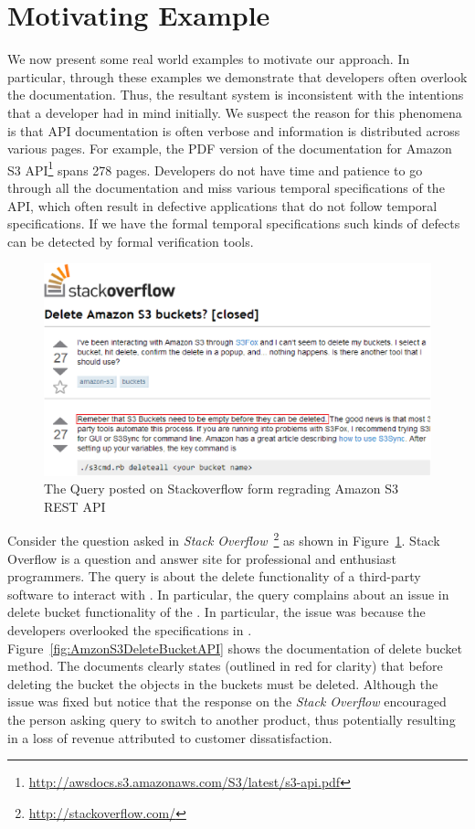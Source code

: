 \section{Motivating Example}
\label{sec:example}

We now present some real world examples to motivate our approach. In particular, through these examples we demonstrate that developers often overlook the documentation. Thus, the resultant system is inconsistent with the intentions that a developer had in mind initially. We suspect the reason for this phenomena is that API documentation is often verbose and information is distributed across various
pages. For example, the PDF version of the documentation for Amazon S3 API\footnote{\url{http://awsdocs.s3.amazonaws.com/S3/latest/s3-api.pdf}} spans 278 pages. Developers do not have time and patience to go through all the documentation and miss various temporal specifications of the API, which often result in defective applications that do not follow temporal specifications. 
If we have the formal temporal specifications such kinds of defects can be detected by formal verification tools.

\begin{figure}[t]
\begin{center}
\includegraphics[scale=0.4]{Stackoverflow.eps}
\end{center}
\caption{\label{fig:Stackoverflow} The Query posted on Stackoverflow form regrading Amazon S3 REST API}
\end{figure}

Consider the question asked in \textit{Stack Overflow}~\footnote{\url{http://stackoverflow.com/}} as shown in Figure~\ref{fig:Stackoverflow}. Stack Overflow is a question and answer site for professional and enthusiast programmers. The query is about the delete functionality of a third-party software  to interact with \amazonAPI. In particular, the query complains about an issue in delete bucket functionality of the . In particular, the issue was because the  developers overlooked the specifications in \amazon. Figure~\ref{fig:AmzonS3DeleteBucketAPI} shows the documentation of delete bucket method. The documents clearly states (outlined in red for clarity) that before deleting the bucket the objects in the buckets must be deleted. Although the issue was fixed but notice that the response on the \textit{Stack Overflow} encouraged the person asking query to switch to another product, thus potentially resulting in a loss of revenue attributed to customer dissatisfaction.  


